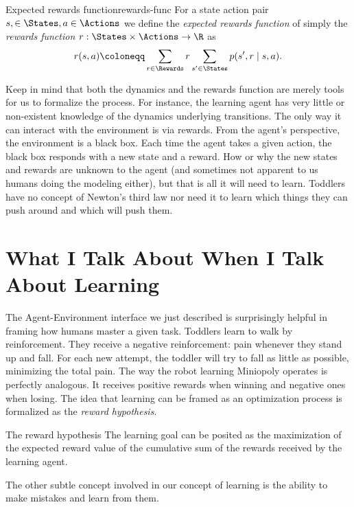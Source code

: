 \begin{dfn}{Expected rewards function}{rewards-func}
	For a state action pair $s, \in \States, a \in \Actions$ we define the
	\emph{expected rewards function} of simply the \emph{rewards function} $r:
	\States \times \Actions \to \R$ as
	\begin{equation*}
		r(s, a) \coloneqq \sum_{r \in \Rewards} r \sum_{s' \in \States} p(s', r \mid s, a).
	\end{equation*}
\end{dfn}

Keep in mind that both the dynamics and the rewards function are merely tools
for us to formalize the process. For instance, the learning agent has very
little or non-existent knowledge of the dynamics underlying transitions. The
only way it can interact with the environment is via rewards. From the agent's
perspective, the environment is a black box. Each time the agent takes a given
action, the black box responds with a new state and a reward. How or why the new
states and rewards are unknown to the agent (and sometimes not apparent to us
humans doing the modeling either), but that is all it will need to learn.
Toddlers have no concept of Newton's third law nor need it to learn which things
they can push around and which will push them.

\section{What I Talk About When I Talk About Learning} The Agent-Environment
interface we just described is surprisingly helpful in framing how humans master
a given task. Toddlers learn to walk by reinforcement.  They receive a negative
reinforcement: pain whenever they stand up and fall.  For each new attempt, the
toddler will try to fall as little as possible, minimizing the total pain. The
way the robot learning Miniopoly operates is perfectly analogous. It receives
positive rewards when winning and negative ones when losing.  The idea that
learning can be framed as an optimization process is formalized as the
\emph{reward hypothesis}.

\begin{remark}{The reward hypothesis}
	The learning goal can be posited as the maximization of the expected reward
	value of the cumulative sum of the rewards received by the learning agent. 
\end{remark}

The other subtle concept involved in our concept of learning is the
ability to make mistakes and learn from them.

